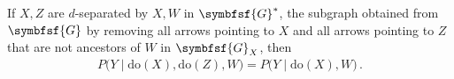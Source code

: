     \begin{axiom}
        If $X,Z$ are $d$-separated by $X,W$ in $\symbfsf{G}^*$, the subgraph obtained from $\symbfsf{G}$ by removing all arrows pointing to $X$ and all arrows pointing to $Z$ that are not ancestors of $W$ in $\symbfsf{G}_X$, then
        \begin{gather}
            P\bigl(Y\mid\mathrm{do}(X),\mathrm{do}(Z),W\bigr) = P\bigl(Y\mid\mathrm{do}(X),W\bigr)\,.
        \end{gather}
    \end{axiom}

